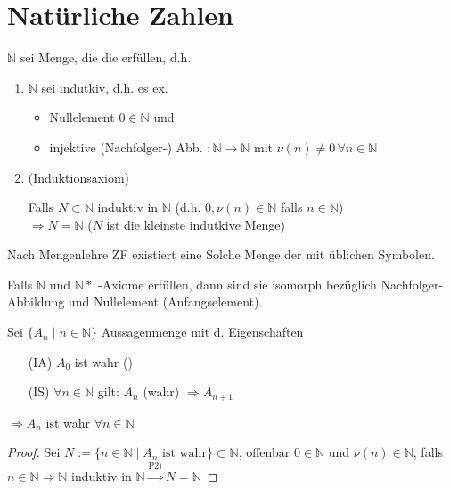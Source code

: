 \addtocounter{section}{2}
\section{Natürliche Zahlen}
\begin{*definition}
$\mathbb{N}$ sei Menge, die die  erfüllen, d.h.
\begin{enumerate}[label={P\arabic*)}]
	\item $\mathbb{N}$ sei indutkiv, d.h. es ex.
	\begin{itemize}
		\item Nullelement $0\in \mathbb{N}$ und
		\item injektive (Nachfolger-) Abb. $:\mathbb{N}\rightarrow\mathbb{N}$ mit $\nu(n)\neq 0\,\forall n\in \mathbb{N}$
	\end{itemize}
	\item (Induktionsaxiom)
	
	Falls $N\subset\mathbb{N}$ induktiv in $\mathbb{N}$ (d.h. $0,\nu(n)\in\mathbb{N}$ falls $n\in\mathbb{N}$)\\
	$\Rightarrow N=\mathbb{N}$ ($N$ ist die kleinste indutkive Menge)
\end{enumerate}

Nach Mengenlehre ZF existiert eine Solche Menge der  mit üblichen Symbolen.
\end{*definition}

\begin{theorem}
	Falls $\mathbb{N}$ und $\mathbb{N}*$ -Axiome erfüllen, dann sind sie isomorph bezüglich Nachfolger-Abbildung und Nullelement (Anfangselement).
\end{theorem}

\begin{proposition} 
	Sei $\{A_n \mid n\in\mathbb{N}\}$ Aussagenmenge mit d. Eigenschaften
	\begin{itemize}
		\item[(IA)] $A_0$ ist wahr ()
		\item[(IS)] $\forall n\in\mathbb{N}$ gilt: $A_n$ (wahr) $\Rightarrow A_{n+1}$
	\end{itemize}
	$\Rightarrow A_n$ ist wahr $\forall n\in\mathbb{N}$
\end{proposition}

\begin{proof}
	Sei $N := \{n \in \mathbb{N} \mid A_n \text{ ist wahr}\} \subset \mathbb{N}$, offenbar $0 \in \mathbb{N}$ und $\nu(n) \in \mathbb{N}$, falls $n \in \mathbb{N} \Rightarrow \mathbb{N}$ induktiv in $\mathbb{N} \overset{\text{P2)}}{\Rightarrow} N = \mathbb{N}$
\end{proof}

